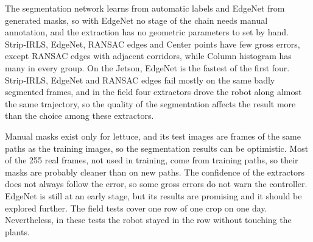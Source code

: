 \documentclass[10pt,a4paper,twocolumn]{article}
\begin{document}
The segmentation network learns from automatic labels and EdgeNet from generated masks, so with EdgeNet no stage of the chain needs manual annotation, and the extraction has no geometric parameters to set by hand. Strip-IRLS, EdgeNet, RANSAC edges and Center points have few gross errors, except RANSAC edges with adjacent corridors, while Column histogram has many in every group. On the Jetson, EdgeNet is the fastest of the first four. Strip-IRLS, EdgeNet and RANSAC edges fail mostly on the same badly segmented frames, and in the field four extractors drove the robot along almost the same trajectory, so the quality of the segmentation affects the result more than the choice among these extractors.

Manual masks exist only for lettuce, and its test images are frames of the same paths as the training images, so the segmentation results can be optimistic. Most of the 255 real frames, not used in training, come from training paths, so their masks are probably cleaner than on new paths. The confidence of the extractors does not always follow the error, so some gross errors do not warn the controller. EdgeNet is still at an early stage, but its results are promising and it should be explored further. The field tests cover one row of one crop on one day. Nevertheless, in these tests the robot stayed in the row without touching the plants.
\end{document}
